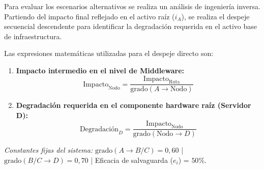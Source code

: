 \documentclass[11pt,a4paper]{article}
\begin{document}
Para evaluar los escenarios alternativos se realiza un análisis de ingeniería inversa. Partiendo del impacto final reflejado en el activo raíz ($i_A$), se realiza el despeje secuencial descendente para identificar la degradación requerida en el activo base de infraestructura.

Las expresiones matemáticas utilizadas para el despeje directo son:
\begin{enumerate}
    \item \textbf{Impacto intermedio en el nivel de Middleware:} 
    \[ \text{Impacto}_{\text{Nodo}} = \frac{\text{Impacto}_{\text{Ruta}}}{\text{grado}(A \rightarrow \text{Nodo})} \]
    \item \textbf{Degradación requerida en el componente hardware raíz (Servidor D):} 
    \[ \text{Degradación}_D = \frac{\text{Impacto}_{\text{Nodo}}}{\text{grado}(\text{Nodo} \rightarrow D)} \]
\end{enumerate}
\textit{Constantes fijas del sistema:} $\text{grado}(A \rightarrow B/C) = 0,60$ | $\text{grado}(B/C \rightarrow D) = 0,70$ | Eficacia de salvaguarda ($e_i$) = $50\%$.

\vspace{0.3cm}
\end{document}

